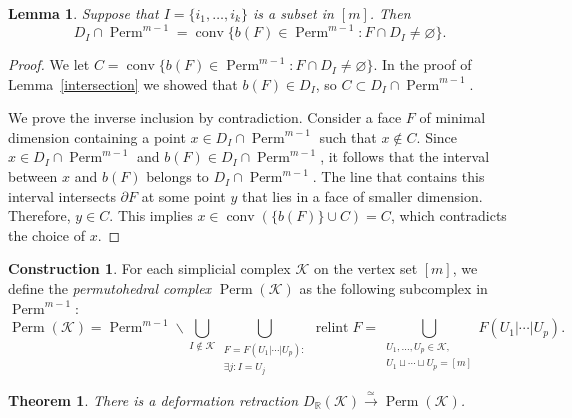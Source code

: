 \documentclass[a4paper,12pt]{amsart}
\newcommand{\K}{\mathcal K}
\newcommand{\RR}{\mathbb R}
\newtheorem{lemma}[formula]{Lemma}
\newtheorem{theorem}[formula]{Theorem}
\theoremstyle{definition}
\newtheorem{construction}[formula]{Construction}
\theoremstyle{remark}
\numberwithin{equation}{section}
\DeclareMathOperator{\conv}{conv}
\DeclareMathOperator{\Perm}{Perm}
\DeclareMathOperator{\relint}{relint}
\begin{document}
\begin{lemma}\label{conv}
Suppose that $I = \{i_1, \ldots, i_k \}$ is a subset in $[m]$. Then 
\[
  D_I \cap \Perm^{m-1} = \conv\{b(F) \in \Perm^{m-1} \colon F \cap D_I \neq \varnothing \}.
\]  
\end{lemma}
\begin{proof}
We let $C = \conv\{b(F) \in \Perm^{m-1} \colon F \cap D_I \neq \varnothing \}$. 
In the proof of Lemma~\ref{intersection} we showed that $b(F)\in D_I$, so $C \subset D_I \cap \Perm^{m-1}$.

We prove the inverse inclusion by contradiction.
Consider a face $F$ of minimal dimension containing a point $x \in D_I \cap \Perm^{m-1}$ such that $x \notin C$.
Since $x \in D_I \cap \Perm^{m-1}$ and $b(F) \in D_I \cap \Perm^{m-1}$, it follows that the interval between $x$ and $b(F)$ belongs to
$D_I \cap \Perm^{m-1}$.  
The line that contains this interval intersects $\partial F$ at some point $y$ that lies in a face of smaller dimension. 
Therefore, $y \in C$. This implies $x \in \conv(\{ b(F)\} \cup C) = C$, which contradicts the choice of $x$.
\end{proof}

\begin{construction}
For each simplicial complex $\K$ on the vertex set $[m]$, we define the \textit{permutohedral complex} $\Perm(\K)$
as the following subcomplex in $\Perm^{m-1}$:
\[
  \Perm(\K) = \Perm^{m-1} \backslash \bigcup_{I \notin \K} \bigcup_{\substack{F = F(U_1 | \cdots | U_p): \\ \exists j\colon 
  I = U_j}} \relint F 
  = \bigcup_{\substack{U_1, \ldots, U_p \in \K, \\ U_1 \sqcup \cdots \sqcup U_p = [m]}} F(U_1 | \cdots | U_p).
\]  
\end{construction}

\begin{theorem}\label{perm-k}
There is a deformation retraction $D_{\RR}(\K) \stackrel{\simeq}\to \Perm(\K)$.
\end{theorem}
\end{document}
